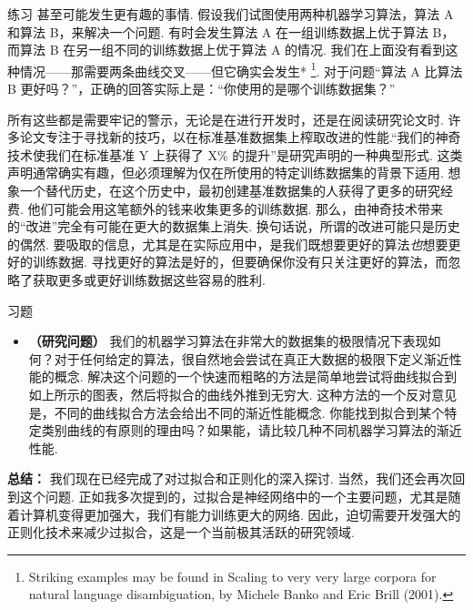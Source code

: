 \begin{exerciseBox}{练习}
甚至可能发生更有趣的事情. 假设我们试图使用两种机器学习算法，算法 A 和算法 B，来解决一个问题. 有时会发生算法 A 在一组训练数据上优于算法 B，而算法 B 在另一组不同的训练数据上优于算法 A 的情况. 我们在上面没有看到这种情况——那需要两条曲线交叉——但它确实会发生* \footnote{Striking examples may be found in Scaling to very very large corpora for natural language disambiguation, by Michele Banko and Eric Brill (2001).}. 对于问题``算法 A 比算法 B 更好吗？''，正确的回答实际上是：``你使用的是哪个训练数据集？''

所有这些都是需要牢记的警示，无论是在进行开发时，还是在阅读研究论文时. 许多论文专注于寻找新的技巧，以在标准基准数据集上榨取改进的性能.``我们的神奇技术使我们在标准基准 Y 上获得了 X\% 的提升''是研究声明的一种典型形式. 这类声明通常确实有趣，但必须理解为仅在所使用的特定训练数据集的背景下适用. 想象一个替代历史，在这个历史中，最初创建基准数据集的人获得了更多的研究经费. 他们可能会用这笔额外的钱来收集更多的训练数据. 那么，由神奇技术带来的``改进''完全有可能在更大的数据集上消失. 换句话说，所谓的改进可能只是历史的偶然. 要吸取的信息，尤其是在实际应用中，是我们既想要更好的算法\emph{也}想要更好的训练数据. 寻找更好的算法是好的，但要确保你没有只关注更好的算法，而忽略了获取更多或更好训练数据这些容易的胜利.

\end{exerciseBox}

\begin{exerciseBox}{习题}

\begin{itemize}

\item \textbf{（研究问题）} 我们的机器学习算法在非常大的数据集的极限情况下表现如何？对于任何给定的算法，很自然地会尝试在真正大数据的极限下定义渐近性能的概念. 解决这个问题的一个快速而粗略的方法是简单地尝试将曲线拟合到如上所示的图表，然后将拟合的曲线外推到无穷大. 这种方法的一个反对意见是，不同的曲线拟合方法会给出不同的渐近性能概念. 你能找到拟合到某个特定类别曲线的有原则的理由吗？如果能，请比较几种不同机器学习算法的渐近性能.

\end{itemize}

\textbf{总结：} 我们现在已经完成了对过拟合和正则化的深入探讨. 当然，我们还会再次回到这个问题. 正如我多次提到的，过拟合是神经网络中的一个主要问题，尤其是随着计算机变得更加强大，我们有能力训练更大的网络. 因此，迫切需要开发强大的正则化技术来减少过拟合，这是一个当前极其活跃的研究领域.

\end{exerciseBox}

